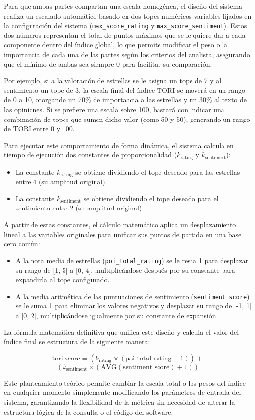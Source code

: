 Para que ambas partes compartan una escala homogénea, el diseño del sistema realiza un escalado automático basado en dos topes numéricos variables fijados en la configuración del sistema (\texttt{max\_score\_rating} y \texttt{max\_score\_sentiment}). Estos dos números representan el total de puntos máximos que se le quiere dar a cada componente dentro del índice global, lo que permite modificar el peso o la importancia de cada una de las partes según los criterios del analista, asegurando que el mínimo de ambas sea siempre 0 para facilitar su comparación.

Por ejemplo, si a la valoración de estrellas se le asigna un tope de 7 y al sentimiento un tope de 3, la escala final del índice TORI se moverá en un rango de 0 a 10, otorgando un 70\% de importancia a las estrellas y un 30\% al texto de las opiniones. Si se prefiere una escala sobre 100, bastará con indicar una combinación de topes que sumen dicho valor (como 50 y 50), generando un rango de TORI entre 0 y 100.

Para ejecutar este comportamiento de forma dinámica, el sistema calcula en tiempo de ejecución dos constantes de proporcionalidad ($k_{\text{rating}}$ y $k_{\text{sentiment}}$):
\begin{itemize}
    \item La constante $k_{\text{rating}}$ se obtiene dividiendo el tope deseado para las estrellas entre 4 (su amplitud original).
    \item La constante $k_{\text{sentiment}}$ se obtiene dividiendo el tope deseado para el sentimiento entre 2 (su amplitud original).
\end{itemize}

A partir de estas constantes, el cálculo matemático aplica un desplazamiento lineal a las variables originales para unificar sus puntos de partida en una base cero común:
\begin{itemize}
    \item A la nota media de estrellas (\texttt{poi\_total\_rating}) se le resta 1 para desplazar su rango de [1, 5] a [0, 4], multiplicándose después por su constante para expandirla al tope configurado.
    \item A la media aritmética de las puntuaciones de sentimiento (\texttt{sentiment\_score}) se le suma 1 para eliminar los valores negativos y desplazar su rango de [-1, 1] a [0, 2], multiplicándose igualmente por su constante de expansión.
\end{itemize}

La fórmula matemática definitiva que unifica este diseño y calcula el valor del índice final se estructura de la siguiente manera:

$$ \text{tori\_score} = \left( k_{\text{rating}} \times (\text{poi\_total\_rating} - 1) \right) + $$
$$ \left( k_{\text{sentiment}} \times (\text{AVG}(\text{sentiment\_score}) + 1) \right) $$

Este planteamiento teórico permite cambiar la escala total o los pesos del índice en cualquier momento simplemente modificando los parámetros de entrada del sistema, garantizando la flexibilidad de la métrica sin necesidad de alterar la estructura lógica de la consulta o el código del software.